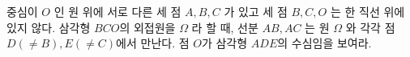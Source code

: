 

중심이 $O$ 인 원 위에 서로 다른 세 점 $A, B, C$ 가 있고 세 점 $B, C, O$ 는 한 직선 위에 있지 않다. 
삼각형 $BCO$의 외접원을 $\Omega$ 라 할 때, 
선분 $AB, AC$ 는 원 $\Omega$ 와 각각 점 $D(\not= B) , E(\not= C)$에서 만난다. 
점 $O$가 삼각형 $ADE$의 수심임을 보여라.  \\